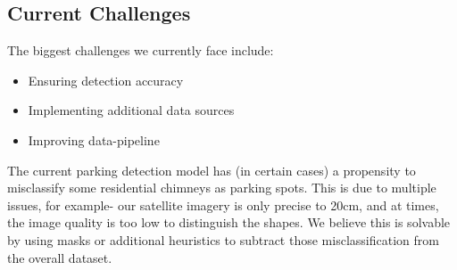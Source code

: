 \begin{figure}[h]
\end{figure}

\subsection{Current Challenges}

\noindent{}The biggest challenges we currently face include:
\vspace{-3mm}
\begin{itemize}
  \item{Ensuring detection accuracy}
  \item{Implementing additional data sources}
  \item{Improving data-pipeline}
\end{itemize}
\vspace{-3mm}

\noindent{}The current parking detection model has (in certain cases) a
propensity to misclassify some residential chimneys as parking spots. This is
due to multiple issues, for example- our satellite imagery is only precise to
20cm, and at times, the image quality is too low to distinguish the shapes. We
believe this is solvable by using masks or additional heuristics to subtract
those misclassification from the overall dataset.

